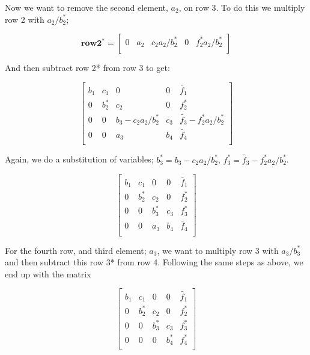 \documentclass[oneside, final, 11pt, english, twocolumn]{article}
\begin{document}
Now we want to remove the second element, $a_2$,  on row 3. To do this we multiply row 2 with $a_2/b_2^*$; 

\[
\mathbf{row 2^*} = 
\left[ {\begin{array}{ccc}
0  \, \, \, \, \, 
a_2 \, \, \, \, \, 
c_2 a_2 /b_2^* \, \, \, \, \, 
0 \, \, \, \, \, 
f_2^* a_2/b_2^*\\
\end{array} } \right]
\]

And then subtract row 2* from row 3 to get: 

\[
    \begin{bmatrix}
                           b_1& c_1 & 0 &0 & \tilde{f_1}\\
                           0 & b^*_2 & c_2 &0 & f^*_2\\
                           0&0 &b_3 - c_2 a_2 /b_2^*& c_3 & \tilde{f_3} - f_2^* a_2/b_2^*\\
                           0&0 & a_3 & b_4 & \tilde{f_4}\\
                      \end{bmatrix}
\]

Again, we do a substitution of variables; $b^*_3 = b_3 - c_2 a_2/b_2^*$, $f^*_3 = \tilde{f_3} - f_2^* a_2 /b_2^*$. 

\[
    \begin{bmatrix}
                           b_1& c_1 & 0 &0 & \tilde{f_1}\\
                           0 & b^*_2 & c_2 &0 & f^*_2\\
                           0&0 &b_3^* & c_3 & f_3^*\\
                           0&0 & a_3 & b_4 & \tilde{f_4}\\
                      \end{bmatrix}
\]


For the fourth row, and third element; $a_3$, we want to multiply row 3 with $a_3/b_3^*$ and then subtract this row 3* from row 4. Following the same steps as above, we end up with the matrix

\[
    \begin{bmatrix}
                           b_1& c_1 & 0 &0 & \tilde{f_1}\\
                           0 & b^*_2 & c_2 &0 & f^*_2\\
                           0&0 &b_3^* & c_3 & f_3^*\\
                           0&0 & 0 & b_4^* & f_4^*\\
                      \end{bmatrix}
\]
\end{document}
